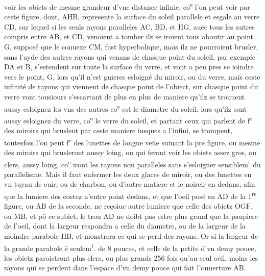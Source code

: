 \documentclass[11pt,a4paper]{article}
\begin{document}
voir les obiets de mesme grandeur d'vne distance infinie. co\textsuperscript{e} l'on peut voir par ceste figure, dont, AHB, represente la surface du soleil parallele et esgale au verre CD, sur lequel si les seuls rayons paralleles AC, BD, et HG, auec tous les autres compris entre AB, et CD, venoient a tomber ilz se iroient tous aboutir au point G, supposé que le conuexe CM, fust hyperbolique, mais ilz ne pourroient brusler, sans l'ayde des autres rayons qui venans de chasque point du soleil, par exemple DA et B, s'estendent sur toute la surface du verre, et vont a peu pres se ioindre vers le point, G, lors qu'il n'est guieres esloigné du miroir, ou du verre, mais ceste infinité de rayons qui viennent de chasque point de l'obiect, sur chasque point du verre vont tousiours s'escartant de plus en plus de maniere qu'ilz se trouuent aussy esloignez les vns des autres co\textsuperscript{e} est le diametre du soleil, lors qu'ilz sont aussy esloignez du verre, co\textsuperscript{e} le verre du soleil, et partant ceux qui parlent de f\textsuperscript{e} des miroirs qui bruslent par ceste maniere iusques a l'infini, se trompent, toutesfois l'on peut f\textsuperscript{e} des lunettes de longue veüe suiuant la pre figure, ou mesme des miroirs qui brusleront aussy loing, ou qui feront voir  les obiets assez gros, ou clers, aussy loing, co\textsuperscript{e} iront les rayons non paralleles sans s'esloigner sensiblem\textsuperscript{t} du parallelisme. Mais il faut enfermer les deux glaces de miroir, ou des lunettes en vn tuyau de cuir, ou de charbon, ou d'autre matiere et le noircir en dedans, afin que la lumiere des costez n'entre point dedans, et que l'oeil posé en AD de la 1\textsuperscript{re} figure, ou AB de la seconde, ne reçoiue autre lumiere que celle des obietz OGF, ou MB, et pō ce subiet, le trou AD ne doibt pas estre plus grand que la paupiere de l'oeil, dont la largeur respondra a celle du diametre, ou de la largeur de la moindre parabole HB, et monstrera ce qui se perd des rayons. Or si la largeur de la grande parabole ē seulem\textsuperscript{t}. de 8 pouces, et celle de la petite d'vn demy pouce, les obietz paroistront plus clers, ou plus grands 256 fois qu'au seul oeil, moins les rayons qui se perdent dans l'espace d'vn demy pouce qui fait l'ouuerture AB.
\end{document}

